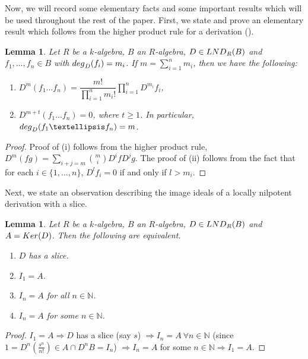 \documentclass[a4paper,12pt]{article}
\newtheorem{lem}[thm]{Lemma}
\newcommand{\bN}{\mathbb N}
\begin{document}
{\smallskip
Now, we will record some elementary facts and some important results  which will be used throughout the rest of the paper. First, we state and prove an elementary result which follows from the higher product rule for a derivation (\cite[Proposition 1.6]{F}).
\begin{lem}\label{prule}
Let $R$ be a $k$-algebra, $B$ an $R$-algebra, $D\in{\rm LND}_{R}(B)$ and $f_1,\dots,f_n\in B$ with ${\rm deg}_D(f_i)=m_i$. If $m=\sum_{i=1}^{n}m_i$, then we have the following:
\begin{enumerate}
	\item[\rm(i)] $D^m(f_1\dots f_n)=\dfrac{m!}{\prod_{i=1}^{n}m_i!}\prod_{i=1}^{n}D^{m_i}f_i$,
	\item[\rm(ii)]$D^{m+t}(f_1\dots f_n)=0$, where $t\geqslant 1$. In particular, ${\rm deg}_D(f_1\dots f_n)=m$.
\end{enumerate}
\end{lem}
\begin{proof} Proof of (i) follows from the higher product rule, $D^m(fg)=\sum\limits_{i+j=m} {m\choose i}D^{i}fD^{j}g$. The proof of (ii) follows from the fact that for each $i \in \{1,\dots ,n \}$, $D^lf_i=0$ if and only if $l > m_i$.
\end{proof}

\smallskip
\indent
Next, we state an observation describing the image ideals of a locally nilpotent derivation with a slice.
\begin{lem}\label{ii_slice}
Let $R$ be a $k$-algebra, $B$ an $R$-algebra, $D \in{\rm LND}_R(B)$ and $A={\rm Ker}(D)$. Then the following are equivalent.
\begin{enumerate}
	\item[\rm(i)]$D$ has a slice.
	\item[\rm(ii)]$I_1=A$.
	\item[\rm(iii)]$I_n=A$ for all $n \in \bN$.
	\item[\rm(iv)] $I_n=A$ for some $n\in\bN$.
\end{enumerate} 
\end{lem}

\begin{proof} $I_1=A \Rightarrow D$ has a slice (say $s$) $\Rightarrow I_n=A ~\forall n \in \bN$  (since $1=D^{n}(\frac{s^n}{n!})\in A \cap D^nB=I_n$) $\Rightarrow I_n=A$ for some $n\in\bN \Rightarrow I_1=A$.




\end{proof}}
\end{document}
